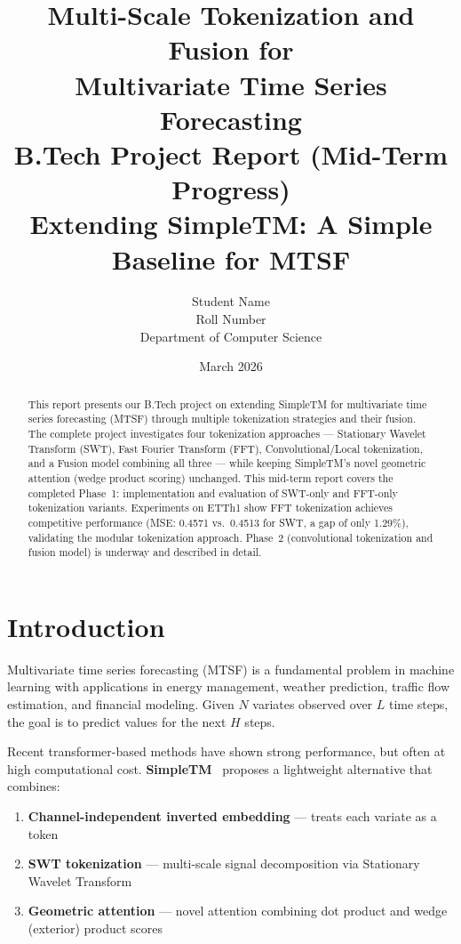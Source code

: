 \documentclass[12pt,a4paper]{article}
\title{%
  \textbf{Multi-Scale Tokenization and Fusion for\\Multivariate Time Series Forecasting}\\[0.5em]
  \large B.Tech Project Report (Mid-Term Progress)\\
  \large Extending SimpleTM: A Simple Baseline for MTSF
}
\author{Student Name \\ Roll Number \\ Department of Computer Science}
\date{March 2026}
\begin{document}
\maketitle

\begin{abstract}
This report presents our B.Tech project on extending SimpleTM for multivariate time series forecasting (MTSF) through multiple tokenization strategies and their fusion. The complete project investigates four tokenization approaches --- Stationary Wavelet Transform (SWT), Fast Fourier Transform (FFT), Convolutional/Local tokenization, and a Fusion model combining all three --- while keeping SimpleTM's novel geometric attention (wedge product scoring) unchanged. This mid-term report covers the completed Phase~1: implementation and evaluation of SWT-only and FFT-only tokenization variants. Experiments on ETTh1 show FFT tokenization achieves competitive performance (MSE: 0.4571 vs.\ 0.4513 for SWT, a gap of only 1.29\%), validating the modular tokenization approach. Phase~2 (convolutional tokenization and fusion model) is underway and described in detail.
\end{abstract}

\tableofcontents
\newpage

\section{Introduction}

Multivariate time series forecasting (MTSF) is a fundamental problem in machine learning with applications in energy management, weather prediction, traffic flow estimation, and financial modeling. Given $N$ variates observed over $L$ time steps, the goal is to predict values for the next $H$ steps.

Recent transformer-based methods have shown strong performance, but often at high computational cost. \textbf{SimpleTM}~\cite{simpletm} proposes a lightweight alternative that combines:
\begin{enumerate}[noitemsep]
  \item \textbf{Channel-independent inverted embedding} --- treats each variate as a token
  \item \textbf{SWT tokenization} --- multi-scale signal decomposition via Stationary Wavelet Transform
  \item \textbf{Geometric attention} --- novel attention combining dot product and wedge (exterior) product scores
\end{enumerate}
\end{document}
